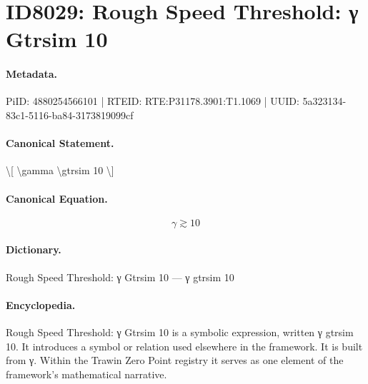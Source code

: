 \section*{ID8029: Rough Speed Threshold: γ Gtrsim 10}
\paragraph{Metadata.}
PiID: 4880254566101 | RTEID: RTE:P31178.3901:T1.1069 | UUID: 5a323134-83c1-5116-ba84-3173819099cf

\paragraph{Canonical Statement.}
\textbackslash{}[ \textbackslash{}gamma \textbackslash{}gtrsim 10 \textbackslash{}]

\paragraph{Canonical Equation.}
\[
\gamma \gtrsim 10
\]

\paragraph{Dictionary.}
Rough Speed Threshold: γ Gtrsim 10 — γ gtrsim 10

\paragraph{Encyclopedia.}
Rough Speed Threshold: γ Gtrsim 10 is a symbolic expression, written γ gtrsim 10. It introduces a symbol or relation used elsewhere in the framework. It is built from γ. Within the Trawin Zero Point registry it serves as one element of the framework's mathematical narrative.
